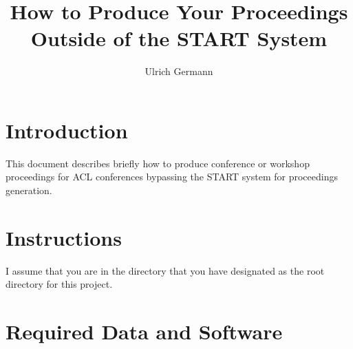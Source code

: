 \documentclass[letterpaper]{article}
\author{Ulrich Germann}
\title{How to Produce Your Proceedings Outside of the START System}
\begin{document}
\maketitle
\section{Introduction}
This document describes briefly how to produce conference or workshop
proceedings for ACL conferences bypassing the START system for
proceedings generation.
\section{Instructions}
I assume that you are in the directory that you have designated as the
root directory for this project.

\section{Required Data and Software}
\end{document}
